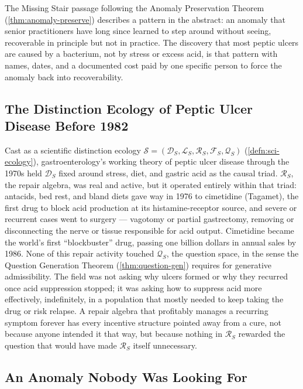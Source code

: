\documentclass[12pt,twoside,openright]{book}
\begin{document}
The Missing Stair passage following the Anomaly Preservation
Theorem (\cref{thm:anomaly-preserve}) describes a pattern in the
abstract: an anomaly that senior practitioners have long since
learned to step around without seeing, recoverable in principle
but not in practice. The discovery that most peptic ulcers are
caused by a bacterium, not by stress or excess acid, is that
pattern with names, dates, and a documented cost paid by one
specific person to force the anomaly back into recoverability.

\subsection{The Distinction Ecology of Peptic Ulcer Disease Before 1982}

Cast as a scientific distinction ecology $\mathcal{S} =
(\mathcal{D}_S, \mathcal{L}_S, \mathcal{R}_S, \mathcal{F}_S,
\mathcal{Q}_S)$ (\cref{defn:sci-ecology}), gastroenterology's
working theory of peptic ulcer disease through the 1970s held
$\mathcal{D}_S$ fixed around stress, diet, and gastric acid as
the causal triad. $\mathcal{R}_S$, the repair algebra, was real
and active, but it operated entirely within that triad:
antacids, bed rest, and bland diets gave way in 1976 to
cimetidine (Tagamet), the first drug to block acid production at
its histamine-receptor source, and severe or recurrent cases
went to surgery --- vagotomy or partial gastrectomy, removing or
disconnecting the nerve or tissue responsible for acid output.
Cimetidine became the world's first ``blockbuster'' drug,
passing one billion dollars in annual sales by 1986. None of
this repair activity touched $\mathcal{Q}_S$, the question space,
in the sense the Question Generation Theorem
(\cref{thm:question-gen}) requires for generative admissibility.
The field was not asking why ulcers formed or why they recurred
once acid suppression stopped; it was asking how to suppress acid
more effectively, indefinitely, in a population that mostly
needed to keep taking the drug or risk relapse. A repair algebra
that profitably manages a recurring symptom forever has every
incentive structure pointed away from a cure, not because anyone
intended it that way, but because nothing in $\mathcal{R}_S$
rewarded the question that would have made $\mathcal{R}_S$ itself
unnecessary.

\subsection{An Anomaly Nobody Was Looking For}
\end{document}
